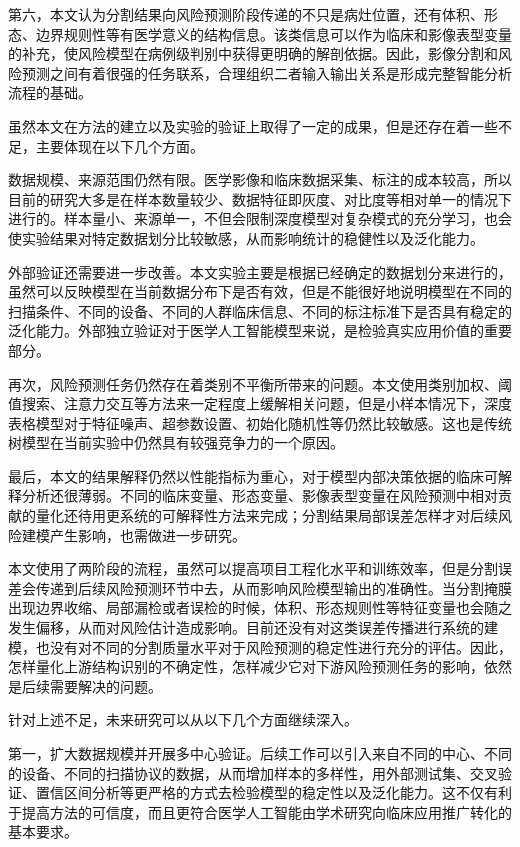 第六，本文认为分割结果向风险预测阶段传递的不只是病灶位置，还有体积、形态、边界规则性等有医学意义的结构信息。该类信息可以作为临床和影像表型变量的补充，使风险模型在病例级判别中获得更明确的解剖依据。因此，影像分割和风险预测之间有着很强的任务联系，合理组织二者输入输出关系是形成完整智能分析流程的基础。

虽然本文在方法的建立以及实验的验证上取得了一定的成果，但是还存在着一些不足，主要体现在以下几个方面。

数据规模、来源范围仍然有限。医学影像和临床数据采集、标注的成本较高，所以目前的研究大多是在样本数量较少、数据特征即灰度、对比度等相对单一的情况下进行的。样本量小、来源单一，不但会限制深度模型对复杂模式的充分学习，也会使实验结果对特定数据划分比较敏感，从而影响统计的稳健性以及泛化能力。

外部验证还需要进一步改善。本文实验主要是根据已经确定的数据划分来进行的，虽然可以反映模型在当前数据分布下是否有效，但是不能很好地说明模型在不同的扫描条件、不同的设备、不同的人群临床信息、不同的标注标准下是否具有稳定的泛化能力。外部独立验证对于医学人工智能模型来说，是检验真实应用价值的重要部分。

再次，风险预测任务仍然存在着类别不平衡所带来的问题。本文使用类别加权、阈值搜索、注意力交互等方法来一定程度上缓解相关问题，但是小样本情况下，深度表格模型对于特征噪声、超参数设置、初始化随机性等仍然比较敏感。这也是传统树模型在当前实验中仍然具有较强竞争力的一个原因。

最后，本文的结果解释仍然以性能指标为重心，对于模型内部决策依据的临床可解释分析还很薄弱。不同的临床变量、形态变量、影像表型变量在风险预测中相对贡献的量化还待用更系统的可解释性方法来完成；分割结果局部误差怎样才对后续风险建模产生影响，也需做进一步研究。

本文使用了两阶段的流程，虽然可以提高项目工程化水平和训练效率，但是分割误差会传递到后续风险预测环节中去，从而影响风险模型输出的准确性。当分割掩膜出现边界收缩、局部漏检或者误检的时候，体积、形态规则性等特征变量也会随之发生偏移，从而对风险估计造成影响。目前还没有对这类误差传播进行系统的建模，也没有对不同的分割质量水平对于风险预测的稳定性进行充分的评估。因此，怎样量化上游结构识别的不确定性，怎样减少它对下游风险预测任务的影响，依然是后续需要解决的问题。

针对上述不足，未来研究可以从以下几个方面继续深入。

第一，扩大数据规模并开展多中心验证。后续工作可以引入来自不同的中心、不同的设备、不同的扫描协议的数据，从而增加样本的多样性，用外部测试集、交叉验证、置信区间分析等更严格的方式去检验模型的稳定性以及泛化能力。这不仅有利于提高方法的可信度，而且更符合医学人工智能由学术研究向临床应用推广转化的基本要求。

